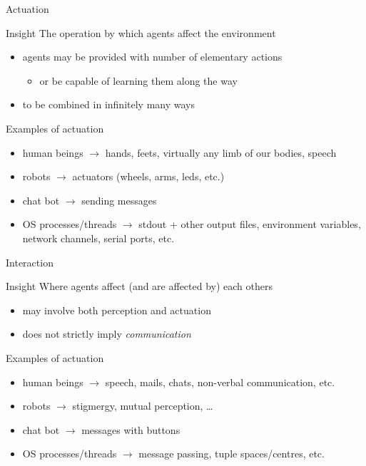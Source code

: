 \documentclass[presentation]{beamer}\mode<presentation>{\usetheme{AMSBolognaFC}}
\begin{document}
\begin{frame}[c]{Actuation}
%
\begin{block}{Insight}
	The operation by which agents affect the environment
	\begin{itemize}
		\item agents may be provided with number of elementary actions
		\begin{itemize}
			\item or be capable of learning them along the way
		\end{itemize}
		\item to be combined in infinitely many ways
	\end{itemize}
\end{block}
%
\begin{exampleblock}{Examples of actuation}
	\begin{itemize}
		\item human beings $\rightarrow$ hands, feets, virtually any limb of our bodies, speech
		\item robots $\rightarrow$ actuators (wheels, arms, leds, etc.) 
		\item chat bot $\rightarrow$ sending messages
		\item OS processes/threads $\rightarrow$ stdout + other output files, environment variables, network channels, serial ports, etc.
	\end{itemize}
\end{exampleblock}
%
\end{frame}

\begin{frame}[c]{Interaction}
%
\begin{block}{Insight}
	Where agents affect (and are affected by) each others
	\begin{itemize}
		\item may involve both perception and actuation
		\item does not strictly imply \emph{communication}
	\end{itemize}
\end{block}
%
\begin{exampleblock}{Examples of actuation}
	\begin{itemize}
		\item human beings $\rightarrow$ speech, mails, chats, non-verbal communication, etc.
		\item robots $\rightarrow$ stigmergy, mutual perception, \ldots
		\item chat bot $\rightarrow$ messages with buttons
		\item OS processes/threads $\rightarrow$ message passing, tuple spaces/centres, etc.
	\end{itemize}
\end{exampleblock}
%
\end{frame}
\end{document}
